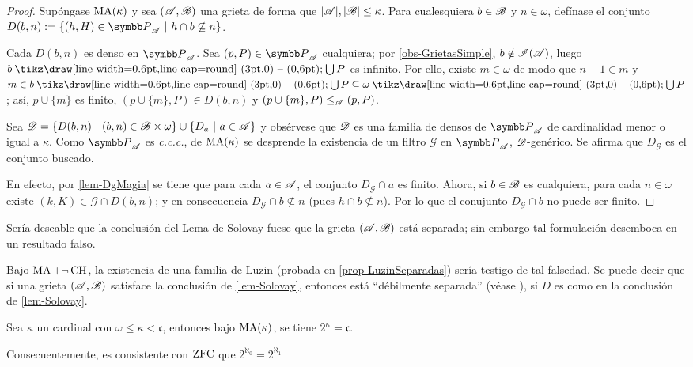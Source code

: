  \begin{proof}
  Supóngase $\operatorname{MA}(\kappa)$ y sea $(\mathscr{A},\mathscr{B})$ una grieta de forma que $|\mathscr{A}|,|\mathscr{B}|\leq \kappa$. Para cualesquiera $b \in \mathscr{B}$ y $n \in \omega$, defínase el conjunto $D(b,n):=\{ (h,H) \in \mathbb{P}_\ms{A} \tq h \cap b \not\subseteq n \}$.

  Cada $D(b,n)$ es denso en $\mathbb{P}_\ms{A}$. Sea $(p,P) \in \mathbb{P}_\ms{A}$ cualquiera; por \ref{obs-GrietasSimple}, $b \notin \mathscr{I}(\mathscr{A}) $, luego $b \setminus \midcup P$ es infinito. Por ello, existe $m \in \omega$ de modo que $n+1 \in m$ y $m \in b \setminus \midcup P \subseteq \omega \setminus \midcup P$; así, $p \cup \{m\}$ es finito, $(p \cup \{m\}, P) \in D(b,n)$ y $(p \cup \{m\}, P) \leq_{\mathscr{A}} (p,P)$.

  Sea $\mathscr{D}=\{ D(b,n) \text{ $|$ } (b,n) \in \mathscr{B} \times \omega \} \cup \{D_a \text{ $|$ } a \in \mathscr{A} \}$ y obsérvese que $\mathscr{D}$ es una familia de densos de $\mathbb{P}_\ms{A}$ de cardinalidad menor o igual a $\kappa$. Como $\mathbb{P}_\ms{A}$ es \textit{c.c.c.}, de $\operatorname{MA}(\kappa)$ se desprende la existencia de un filtro $\mathcal{G}$ en $\mathbb{P}_\ms{A}$, $\mathscr{D}$-genérico. Se afirma que $D_\mathcal{G}$ es el conjunto buscado.

  En efecto, por \ref{lem-DgMagia} se tiene que para cada $a \in \mathscr{A}$, el conjunto $D_\mathcal{G} \cap a$ es finito. Ahora, si $b \in \mathscr{B}$ es cualquiera, para cada $n \in \omega$ existe $(k,K) \in \mathcal{G} \cap D(b,n)$; y en consecuencia $D_\mathcal{G} \cap b \not \subseteq n$ (pues $h \cap b \not \subseteq n$). Por lo que el conujunto $D_\mathcal{G} \cap b$ no puede ser finito.
 \end{proof}

 Sería deseable que la conclusión del Lema de Solovay fuese que la grieta $(\mathscr{A},\mathscr{B})$ está separada; sin embargo tal formulación desemboca en un resultado falso.

 Bajo $\operatorname{MA} + \lnot\operatorname{CH}$, la existencia de una familia de Luzin (probada en \ref{prop-LuzinSeparadas}) sería testigo de tal falsedad. Se puede decir que si una grieta $(\mathscr{A},\mathscr{B})$ satisface la conclusión de \ref{lem-Solovay}, entonces está ``débilmente separada'' (véase \cite[\S~ 3.2]{hruAlmost}), si $D$ es como en la conclusión de \ref{lem-Solovay}.


 \begin{corolario}
  Sea $\kappa$ un cardinal con $\omega \leq \kappa <\mathfrak{c}$, entonces bajo $\operatorname{MA}(\kappa)$, se tiene $2^\kappa=\mathfrak{c}$.

  Consecuentemente, es consistente con $\operatorname{ZFC}$ que $2^{\aleph_0}=2^{\aleph_1}$
 \end{corolario}

